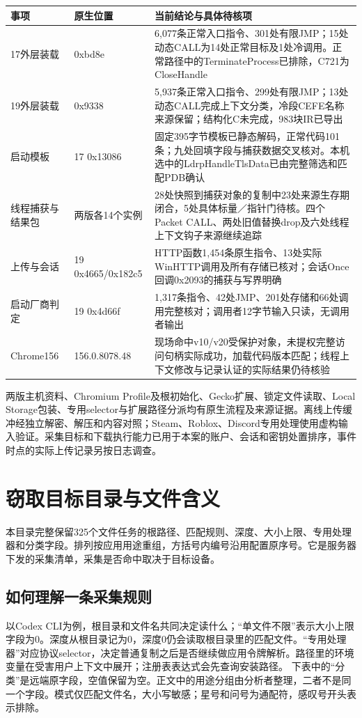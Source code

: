 \documentclass[UTF8,a4paper,zihao=5,fontset=windows]{ctexart}
\newcommand{\code}[1]{{\ttfamily\small #1}}
\begin{document}
\begin{longtable}{@{}L{30mm}L{44mm}L{76mm}@{}}\toprule 事项 & 原生位置 & 当前结论与具体待核项\\\midrule\endhead
17外层装载 & \code{0xbd8e} & 6,077条正常入口指令、301处有限JMP；15处动态CALL为14处正常目标及1处冷调用。正常路径中的\code{TerminateProcess}已排除，\code{C721}为\code{CloseHandle}\\
19外层装载 & \code{0x9338} & 5,937条正常入口指令、299处有限JMP；13处动态CALL完成上下文分类，冷段\code{CEFE}名称来源保留；结构化C未完成，983块IR已导出\\
启动模板 & 17 \code{0x13086} & 固定395字节模板已静态解码，正常代码101条；九处回填字段与捕获数据交叉核对。本机选中的\code{LdrpHandleTlsData}已由完整筛选和匹配PDB确认\\
线程捕获与结果包 & 两版各14个实例 & 28处快照到捕获对象的复制中23处来源生存期闭合，5处具体标量／指针门待核。四个Packet CALL、两处旧值替换drop及六处线程上下文钩子来源继续追踪\\
上传与会话 & 19 \code{0x4665/0x182c5} & HTTP函数1,454条原生指令、13处实际WinHTTP调用及所有存储已核对；会话Once回调\code{0x2093}的捕获与写界明确\\
启动厂商判定 & 19 \code{0x4d66f} & 1,317条指令、42处JMP、201处存储和66处调用完整核对；调用者12字节输入只读，无调用者输出\\
Chrome156 & \code{156.0.8078.48} & 现场命中v10/v20受保护对象，未提权完整访问句柄实际成功，加载代码版本匹配；线程上下文修改与记录认证的实际结果仍待核验\\\bottomrule\end{longtable}

两版主机资料、Chromium Profile及根初始化、Gecko扩展、锁定文件读取、Local Storage包装、专用selector与扩展路径分派均有原生流程及来源证据。离线上传缓冲经独立解密、解压和内容对照；Steam、Roblox、Discord专用处理使用虚构输入验证。采集目标和下载执行能力已用于本案的账户、会话和密钥处置排序，事件时点的实际上传记录另按日志调查。

\clearpage\appendix\section{窃取目标目录与文件含义}\label{app:targets}
本目录完整保留325个文件任务的根路径、匹配规则、深度、大小上限、专用处理器和分类字段。排列按应用用途重组，方括号内编号沿用配置原序号。它是服务器下发的采集清单，采集是否命中取决于目标设备。
\subsection{如何理解一条采集规则}
以Codex CLI为例，根目录和文件名共同决定读什么；“单文件不限”表示大小上限字段为0。深度从根目录记为0，深度0仍会读取根目录里的匹配文件。“专用处理器”对应协议selector，决定普通复制之后是否继续做应用令牌解析。路径里的环境变量在受害用户上下文中展开；注册表表达式会先查询安装路径。
下表中的“分类”是远端原字段，空值保留为空。正文中的用途分组由分析者整理，二者不是同一个字段。模式仅匹配文件名，大小写敏感；星号和问号为通配符，感叹号开头表示排除。
\end{document}
